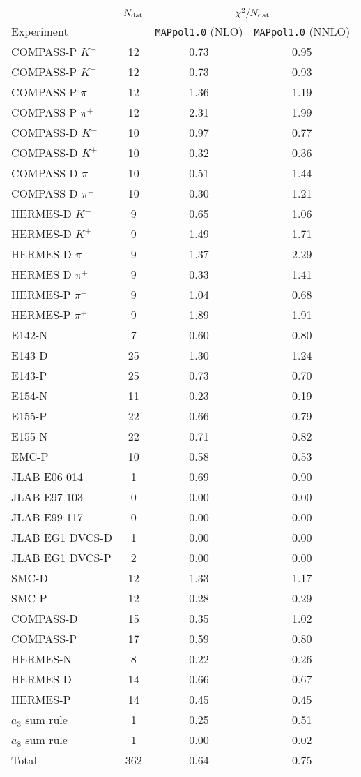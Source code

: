 \begin{tabular}{l@{\hspace{1cm}}c@{\hspace{1cm}}c@{\hspace{1cm}}c}
  \toprule \midrule
  \addlinespace
                        &  $N_{\textrm{dat}}$  & \multicolumn{2}{c}{$\chi^2/N_{\textrm{dat}}$} \\
  \cmidrule(lr){3-4}
      Experiment        &           &   \texttt{MAPpol1.0} (NLO)   &  \texttt{MAPpol1.0} (NNLO)  \tabularnewline
  \midrule
  \addlinespace
      COMPASS-P $K^-$  &  12 &   0.73   &   0.95   \tabularnewline
      COMPASS-P $K^+$  &  12 &   0.73   &   0.93   \tabularnewline
    COMPASS-P $\pi^-$  &  12 &   1.36   &   1.19   \tabularnewline
    COMPASS-P $\pi^+$  &  12 &   2.31   &   1.99   \tabularnewline
      COMPASS-D $K^-$  &  10 &   0.97   &   0.77   \tabularnewline
      COMPASS-D $K^+$  &  10 &   0.32   &   0.36   \tabularnewline
    COMPASS-D $\pi^-$  &  10 &   0.51   &   1.44   \tabularnewline
    COMPASS-D $\pi^+$  &  10 &   0.30   &   1.21   \tabularnewline
      HERMES-D  $K^-$  &   9 &   0.65   &   1.06   \tabularnewline
      HERMES-D  $K^+$  &   9 &   1.49   &   1.71   \tabularnewline
    HERMES-D  $\pi^-$  &   9 &   1.37   &   2.29   \tabularnewline
    HERMES-D  $\pi^+$  &   9 &   0.33   &   1.41   \tabularnewline
    HERMES-P  $\pi^-$  &   9 &   1.04   &   0.68   \tabularnewline
    HERMES-P  $\pi^+$  &   9 &   1.89   &   1.91   \tabularnewline
               E142-N  &   7 &   0.60   &   0.80   \tabularnewline
               E143-D  &  25 &   1.30   &   1.24   \tabularnewline
               E143-P  &  25 &   0.73   &   0.70   \tabularnewline
               E154-N  &  11 &   0.23   &   0.19   \tabularnewline
               E155-P  &  22 &   0.66   &   0.79   \tabularnewline
               E155-N  &  22 &   0.71   &   0.82   \tabularnewline
                EMC-P  &  10 &   0.58   &   0.53   \tabularnewline
         JLAB E06 014  &   1 &   0.69   &   0.90   \tabularnewline
         JLAB E97 103  &   0 &   0.00   &   0.00   \tabularnewline
         JLAB E99 117  &   0 &   0.00   &   0.00   \tabularnewline
      JLAB EG1 DVCS-D  &   1 &   0.00   &   0.00   \tabularnewline
      JLAB EG1 DVCS-P  &   2 &   0.00   &   0.00   \tabularnewline
                SMC-D  &  12 &   1.33   &   1.17   \tabularnewline
                SMC-P  &  12 &   0.28   &   0.29   \tabularnewline
            COMPASS-D  &  15 &   0.35   &   1.02   \tabularnewline    
            COMPASS-P  &  17 &   0.59   &   0.80   \tabularnewline
             HERMES-N  &   8 &   0.22   &   0.26   \tabularnewline
             HERMES-D  &  14 &   0.66   &   0.67   \tabularnewline
             HERMES-P  &  14 &   0.45   &   0.45   \tabularnewline
       $a_3$ sum rule  &   1 &   0.25   &   0.51   \tabularnewline
       $a_8$ sum rule  &   1 &   0.00   &   0.02   \tabularnewline
  \midrule
  \addlinespace
                Total  & 362 &   0.64     &   0.75   \tabularnewline
  \midrule \bottomrule
\end{tabular}
